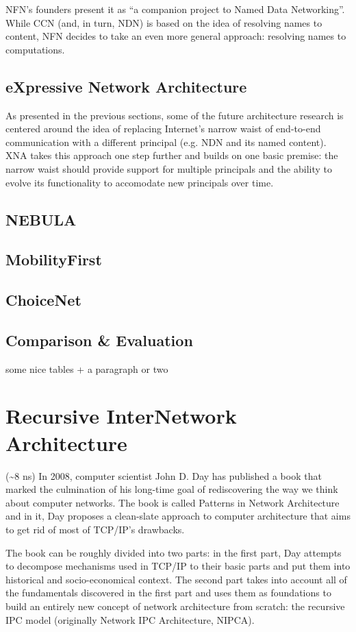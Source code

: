         NFN's founders present it as ``a companion project to Named Data Networking''. While CCN (and, in turn, NDN) is based on the idea of resolving names to content, NFN decides to take an even more general approach: resolving names to computations.

    \section{eXpressive Network Architecture}
        As presented in the previous sections, some of the future architecture research is centered around the idea of replacing Internet's narrow waist of end-to-end communication with a different principal (e.g. NDN and its named content). XNA takes this approach one step further and builds on one basic premise: the narrow waist should provide support for multiple principals and the ability to evolve its functionality to accomodate new principals over time.

    \section{NEBULA}
    \section{MobilityFirst}
    \section{ChoiceNet}
    \section{Comparison \& Evaluation}
        some nice tables + a paragraph or two


\chapter{Recursive InterNetwork Architecture}
    (\textasciitilde8 ns)
    In 2008, computer scientist John D. Day has published a book that marked the culmination of his long-time goal of rediscovering the way we think about computer networks. The book is called Patterns in Network Architecture and in it, Day proposes a clean-slate approach to computer architecture that aims to get rid of most of TCP/IP's drawbacks.

    The book can be roughly divided into two parts: in the first part, Day attempts to decompose mechanisms used in TCP/IP to their basic parts and put them into historical and socio-economical context. The second part takes into account all of the fundamentals discovered in the first part and uses them as foundations to build an entirely new concept of network architecture from scratch: the recursive IPC model (originally Network IPC Architecture, NIPCA).

